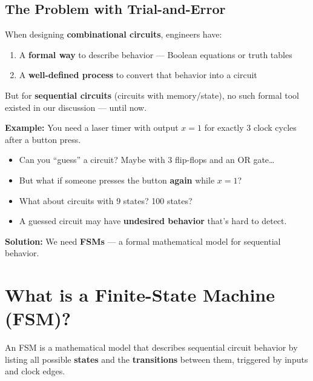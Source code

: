 \documentclass[12pt, a4paper]{article}
\begin{document}
\subsection{The Problem with Trial-and-Error}

When designing \textbf{combinational circuits}, engineers have:
\begin{enumerate}
  \item A \textbf{formal way} to describe behavior --- Boolean equations or truth tables
  \item A \textbf{well-defined process} to convert that behavior into a circuit
\end{enumerate}

But for \textbf{sequential circuits} (circuits with memory/state), no such formal tool existed in our discussion --- until now.

\begin{important}
  \textbf{Example:} You need a laser timer with output $x=1$ for exactly 3 clock cycles after a button press.
  \begin{itemize}
    \item Can you ``guess'' a circuit? Maybe with 3 flip-flops and an OR gate\ldots
    \item But what if someone presses the button \textbf{again} while $x=1$?
    \item What about circuits with 9 states? 100 states?
    \item A guessed circuit may have \textbf{undesired behavior} that's hard to detect.
  \end{itemize}
  \textbf{Solution:} We need \textbf{FSMs} --- a formal mathematical model for sequential behavior.
\end{important}

\section{What is a Finite-State Machine (FSM)?}

\begin{keypoint}[Definition]
  An FSM is a mathematical model that describes sequential circuit behavior by listing all possible \textbf{states} and the \textbf{transitions} between them, triggered by inputs and clock edges.
\end{keypoint}
\end{document}
